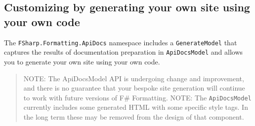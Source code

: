\documentclass{article}
\begin{document}
\subsection*{Customizing by generating your own site using your own code}



The \texttt{FSharp.Formatting.ApiDocs} namespace includes a \texttt{GenerateModel} that captures
the results of documentation preparation in \texttt{ApiDocsModel} and allows you to
generate your own site using your own code.
\begin{quote}


NOTE: The ApiDocsModel API is undergoing change and improvement, and there is no guarantee that your bespoke site
generation will continue to work
with future versions of F\# Formatting.
NOTE: The \texttt{ApiDocsModel} currently includes some generated HTML with some specific style tags.
In the long term these may be removed from the design of that component.
\end{quote}
\end{document}
